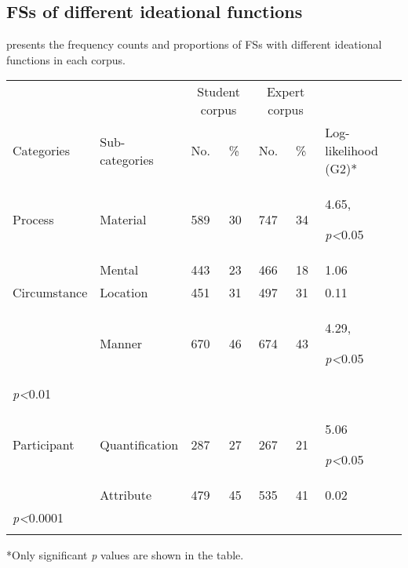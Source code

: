 \subsection{FSs of different ideational functions} 

 presents the frequency counts and proportions of FSs with different ideational functions in each corpus.


\begin{tabularx}{\textwidth}{XXXXXXX} &  & \multicolumn{2}{c}{Student corpus} & \multicolumn{2}{c}{Expert corpus} & \\

\lsptoprule
Categories & Sub-categories & No. & \% & No. & \% & Log-likelihood (G2)*\\
Process & Material & 589 & 30 & 747 & 34 & 4.65, 

\textit{p<}0.05\\
& Mental & 443 & 23 & 466 & 18 & 1.06\\
Circumstance & Location & 451 & 31 & 497 & 31 & 0.11\\
& Manner & 670 & 46 & 674 & 43 & 4.29,

\textit{p<}0.05\\

\textit{p<}0.01\\
Participant & Quantification & 287 & 27 & 267 & 21 & 5.06

\textit{p<}0.05\\
& Attribute & 479 & 45 & 535 & 41 & 0.02\\

\textit{p<}0.0001\\
\lspbottomrule
\end{tabularx}
*Only significant \textit{p} values are shown in the table.

